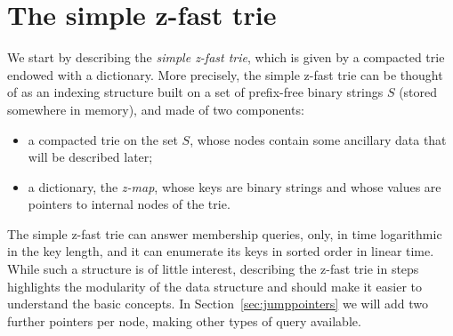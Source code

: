 \documentclass[a4paper]{article}
\newcommand{\?}{\mskip1.5mu}
\begin{document}
\section{The simple z-fast trie} 

We start by describing the \emph{simple z-fast trie}, which is 
given by a compacted trie~\cite{KnuACP} endowed with a dictionary. 
More precisely, the simple z-fast trie can be
thought of as an indexing structure built on a set of prefix-free binary strings $S$
(stored somewhere in memory), and made of two components:
\begin{itemize}
  \item a compacted trie on the set $S$, whose nodes contain some ancillary data that will be described later;
  \item a dictionary, the \emph{z-map}, whose keys are binary
  strings and whose values are pointers to internal nodes of the trie.
\end{itemize}

The simple z-fast trie can answer membership queries, only, in time logarithmic in the key length, and it can enumerate its
keys in sorted order in linear time. While such a structure is of little interest,
describing the z-fast trie in steps highlights the modularity of the data structure
and should make it easier to understand the basic concepts.
In Section~\ref{sec:jumppointers} we will add 
two further pointers per node, making other types of query available.
\end{document}
